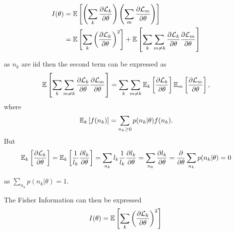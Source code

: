 \begin{alignat}{2}
	I(\theta) 
	& =\mathbb{E}\left[\left(\sum_k\frac{\partial \mathcal{L}_k}{\partial\theta}\right)\left(\sum_m\frac{\partial \mathcal{L}_m}{\partial\theta}\right)\right]\\
	& =\mathbb{E}\left[\sum_k\left(\frac{\partial \mathcal{L}_k}{\partial\theta}\right)^2\right]+\mathbb{E}\left[\sum_k\sum_{m\neq k}\frac{\partial \mathcal{L}_k}{\partial\theta}\frac{\partial \mathcal{L}_m}{\partial\theta}\right]
\end{alignat}

%
as $n_k$ are iid then the second term can be expressed as 
%
\begin{equation}
	\mathbb{E}\left[\sum_k\sum_{m\neq k}\frac{\partial \mathcal{L}_k}{\partial\theta}\frac{\partial \mathcal{L}_m}{\partial\theta}\right] 
	=\sum_k\sum_{m\neq k}\mathbb{E}_k\left[\frac{\partial \mathcal{L}_k}{\partial\theta}\right]\mathbb{E}_m\left[\frac{\partial \mathcal{L}_m}{\partial\theta}\right],
\end{equation}
%
where
%
\begin{equation}
	\mathbb{E}_k\left[f(n_k)\right]=\sum_{n_k\geq0}p(n_k|\theta)f(n_k).
\end{equation}
%
But 
\begin{equation}
	\mathbb{E}_k\left[\frac{\partial \mathcal{L}_k}{\partial\theta}\right]=\mathbb{E}_k\left[\frac{1}{l_k}\frac{\partial l_k}{\partial\theta}\right]=\sum_{n_k}l_k\frac{1}{l_k}\frac{\partial l_k}{\partial\theta}=\sum_{n_k}\frac{\partial l_k}{\partial\theta}=\frac{\partial}{\partial\theta}\sum_{n_k}p(n_k|\theta)=0
\end{equation}

as $\sum_{n_k}p(n_k|\theta)=1$. 

The Fisher Information can then be expressed 
%
\begin{equation}
	I(\theta) =\mathbb{E}\left[\sum_k\left(\frac{\partial \mathcal{L}_k}{\partial\theta}\right)^2\right]\\
\end{equation}

